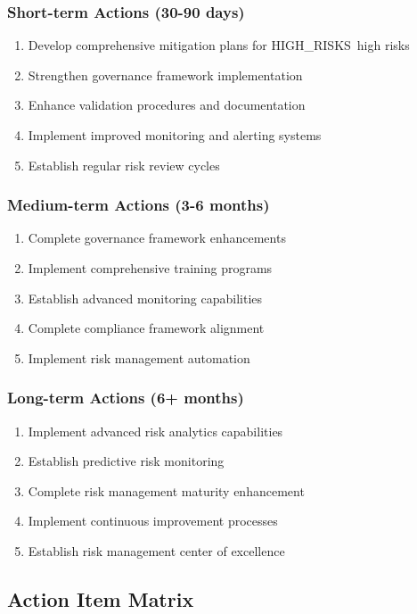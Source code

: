 \documentclass[11pt,a4paper]{article}
\newcommand{\highrisks}{{{HIGH_RISKS}}}
\begin{document}
\subsubsection{Short-term Actions (30-90 days)}
\begin{enumerate}
\item Develop comprehensive mitigation plans for \highrisks\ high risks
\item Strengthen governance framework implementation
\item Enhance validation procedures and documentation
\item Implement improved monitoring and alerting systems
\item Establish regular risk review cycles
\end{enumerate}

\subsubsection{Medium-term Actions (3-6 months)}
\begin{enumerate}
\item Complete governance framework enhancements
\item Implement comprehensive training programs
\item Establish advanced monitoring capabilities
\item Complete compliance framework alignment
\item Implement risk management automation
\end{enumerate}

\subsubsection{Long-term Actions (6+ months)}
\begin{enumerate}
\item Implement advanced risk analytics capabilities
\item Establish predictive risk monitoring
\item Complete risk management maturity enhancement
\item Implement continuous improvement processes
\item Establish risk management center of excellence
\end{enumerate}

\subsection{Action Item Matrix}
\end{document}
